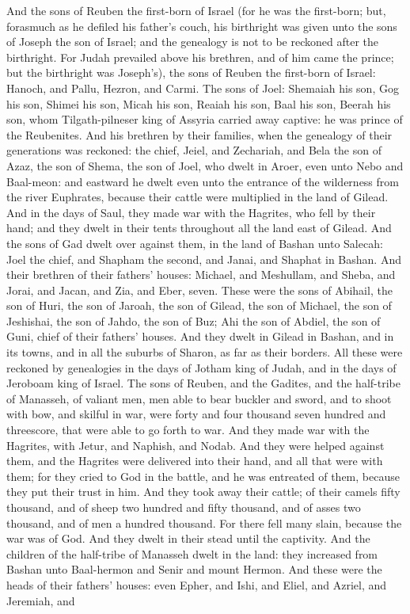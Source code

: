 And the sons of Reuben the first-born of Israel (for he was the first-born; but, forasmuch as he defiled his father’s couch, his birthright was given unto the sons of Joseph the son of Israel; and the genealogy is not to be reckoned after the birthright. For Judah prevailed above his brethren, and of him came the prince; but the birthright was Joseph’s), the sons of Reuben the first-born of Israel: Hanoch, and Pallu, Hezron, and Carmi. The sons of Joel: Shemaiah his son, Gog his son, Shimei his son, Micah his son, Reaiah his son, Baal his son, Beerah his son, whom Tilgath-pilneser king of Assyria carried away captive: he was prince of the Reubenites. And his brethren by their families, when the genealogy of their generations was reckoned: the chief, Jeiel, and Zechariah, and Bela the son of Azaz, the son of Shema, the son of Joel, who dwelt in Aroer, even unto Nebo and Baal-meon: and eastward he dwelt even unto the entrance of the wilderness from the river Euphrates, because their cattle were multiplied in the land of Gilead. And in the days of Saul, they made war with the Hagrites, who fell by their hand; and they dwelt in their tents throughout all the land east of Gilead.  And the sons of Gad dwelt over against them, in the land of Bashan unto Salecah: Joel the chief, and Shapham the second, and Janai, and Shaphat in Bashan. And their brethren of their fathers’ houses: Michael, and Meshullam, and Sheba, and Jorai, and Jacan, and Zia, and Eber, seven. These were the sons of Abihail, the son of Huri, the son of Jaroah, the son of Gilead, the son of Michael, the son of Jeshishai, the son of Jahdo, the son of Buz; Ahi the son of Abdiel, the son of Guni, chief of their fathers’ houses. And they dwelt in Gilead in Bashan, and in its towns, and in all the suburbs of Sharon, as far as their borders. All these were reckoned by genealogies in the days of Jotham king of Judah, and in the days of Jeroboam king of Israel.  The sons of Reuben, and the Gadites, and the half-tribe of Manasseh, of valiant men, men able to bear buckler and sword, and to shoot with bow, and skilful in war, were forty and four thousand seven hundred and threescore, that were able to go forth to war. And they made war with the Hagrites, with Jetur, and Naphish, and Nodab. And they were helped against them, and the Hagrites were delivered into their hand, and all that were with them; for they cried to God in the battle, and he was entreated of them, because they put their trust in him. And they took away their cattle; of their camels fifty thousand, and of sheep two hundred and fifty thousand, and of asses two thousand, and of men a hundred thousand. For there fell many slain, because the war was of God. And they dwelt in their stead until the captivity.  And the children of the half-tribe of Manasseh dwelt in the land: they increased from Bashan unto Baal-hermon and Senir and mount Hermon. And these were the heads of their fathers’ houses: even Epher, and Ishi, and Eliel, and Azriel, and Jeremiah, and 